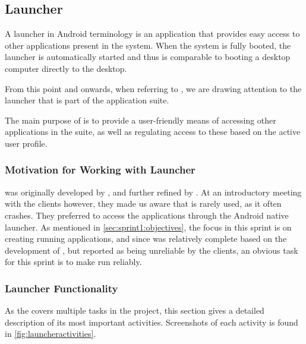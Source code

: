 \subsection{Launcher}\label{sec:launcher}
A launcher in Android terminology is an application that provides easy access to other applications present in the system.
When the system is fully booted, the launcher is automatically started and thus is comparable to booting a desktop computer directly to the desktop.

From this point and onwards, when referring to \launcher, we are drawing attention to the launcher that is part of the \giraf application suite.

The main purpose of \launcher is to provide a user-friendly means of accessing other applications in the \giraf suite, as well as regulating access to these based on the active user profile.

\subsubsection{Motivation for Working with Launcher}
\launcher was originally developed by \citet{launcher2011}, and further refined by \citet{launcher2012}.
At an introductory meeting with the clients however, they made us aware that \launcher is rarely used, as it often crashes.
They preferred to access the \giraf applications through the Android native launcher.
As mentioned in \cref{sec:sprint1:objectives}, the focus in this sprint is on creating running applications, and since \launcher was relatively complete based on the development of \citet{launcher2012}, but reported as being unreliable by the clients, an obvious task for this sprint is to make \launcher run reliably.

\subsubsection{Launcher Functionality}
As the \launcher covers multiple tasks in the \giraf project, this section gives a detailed description of its most important activities.
Screenshots of each activity is found in \cref{fig:launcheractivities}.

